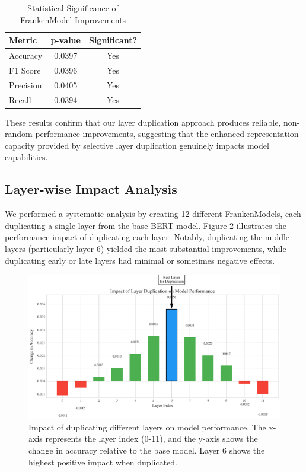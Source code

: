 \documentclass{article}
\begin{document}
\begin{table}[h]
\caption{Statistical Significance of FrankenModel Improvements}
\centering
\begin{tabular}{lcc}
\toprule
\textbf{Metric} & \textbf{p-value} & \textbf{Significant?} \\
\midrule
Accuracy & 0.0397 & Yes \\
F1 Score & 0.0396 & Yes \\
Precision & 0.0405 & Yes \\
Recall & 0.0394 & Yes \\
\bottomrule
\end{tabular}
\end{table}

These results confirm that our layer duplication approach produces reliable, non-random performance improvements, suggesting that the enhanced representation capacity provided by selective layer duplication genuinely impacts model capabilities.

\subsection{Layer-wise Impact Analysis}
We performed a systematic analysis by creating 12 different FrankenModels, each duplicating a single layer from the base BERT model. Figure 2 illustrates the performance impact of duplicating each layer. Notably, duplicating the middle layers (particularly layer 6) yielded the most substantial improvements, while duplicating early or late layers had minimal or sometimes negative effects.

\begin{figure}[H]
\centering
\includegraphics[width=\textwidth]{layer_impact.png}
\caption{Impact of duplicating different layers on model performance. The x-axis represents the layer index (0-11), and the y-axis shows the change in accuracy relative to the base model. Layer 6 shows the highest positive impact when duplicated.}
\end{figure}
\end{document}
